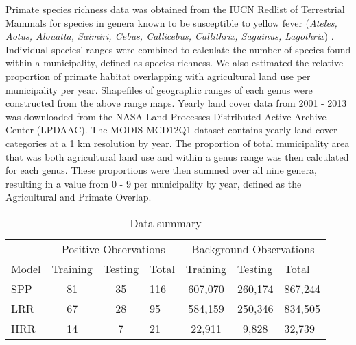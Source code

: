 \documentclass{article}
\begin{document}
Primate species richness data was obtained from the IUCN Redlist of Terrestrial Mammals for species in genera known to be susceptible to yellow fever (\textit{Ateles, Aotus, Alouatta, Saimiri, Cebus, Callicebus, Callithrix, Saguinus, Lagothrix}) \cite{bicca-marques2010,hamrick2017}. Individual species' ranges were combined to calculate the number of species found within a municipality, defined as species richness. We also estimated the relative proportion of primate habitat overlapping with agricultural land use per municipality per year. Shapefiles of geographic ranges of each genus were constructed from the above range maps. Yearly land cover data from 2001 - 2013 was downloaded from the NASA Land Processes Distributed Active Archive Center (LPDAAC). The MODIS MCD12Q1 dataset contains yearly land cover categories at a 1 km resolution by year. The proportion of total municipality area that was both agricultural land use and within a genus range was then calculated for each genus.  These proportions were then summed over all nine genera, resulting in a value from 0 - 9 per municipality by year, defined as the Agricultural and Primate Overlap.



\clearpage

\begin{table}[h]
\normalsize
\centering
\caption{Data summary}
\label{my-label}
\begin{tabular}{lcclccl}
      & \multicolumn{3}{c}{Positive Observations}                          & \multicolumn{3}{c}{Background Observations}                          \\ \cline{2-7}
Model & \multicolumn{1}{l}{Training} & \multicolumn{1}{l}{Testing} & Total & \multicolumn{1}{l}{Training} & \multicolumn{1}{l}{Testing} & Total   \\ \hline
SPP   & 81                           & 35                          & 116   & 607,070                      & 260,174                     & 867,244 \\
LRR   & 67                           & 28                          & 95    & 584,159                      & 250,346                     & 834,505 \\
HRR   & 14                           & 7                           & 21    & 22,911                       & 9,828                       & 32,739
\end{tabular}
\end{table}
\end{document}
